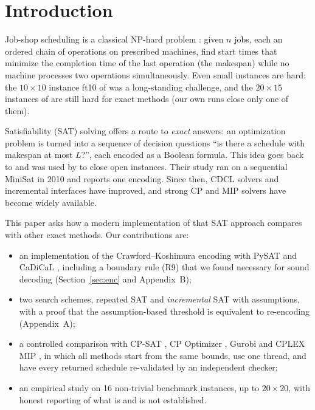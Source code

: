 \documentclass[a4paper,fleqn]{cas-sc}
\begin{document}
\section{Introduction}
Job-shop scheduling is a classical NP-hard problem \citep{garey1976}: given $n$ jobs, each an ordered chain of operations on prescribed machines, find start times that minimize the completion time of the last operation (the makespan) while no machine processes two operations simultaneously.
Even small instances are hard: the $10\times10$ instance ft10 of \citet{fisher1963} was a long-standing challenge, and the $20\times15$ instances of \citet{adams1988} are still hard for exact methods (our own runs close only one of them).

Satisfiability (SAT) solving offers a route to \emph{exact} answers: an optimization problem is turned into a sequence of decision questions ``is there a schedule with makespan at most $L$?'', each encoded as a Boolean formula.
This idea goes back to \citet{crawford1994} and was used by \citet{koshimura2010} to close open instances.
Their study ran on a sequential MiniSat in 2010 and reports one encoding.
Since then, CDCL solvers and incremental interfaces have improved, and strong CP and MIP solvers have become widely available.

This paper asks how a modern implementation of that SAT approach compares with other exact methods.
Our contributions are:
\begin{itemize}
  \item an implementation of the Crawford--Koshimura encoding with PySAT \citep{ignatiev2018} and CaDiCaL \citep{biere2020}, including a boundary rule (R9) that we found necessary for sound decoding (Section~\ref{sec:enc} and Appendix~B);
  \item two search schemes, repeated SAT and \emph{incremental} SAT with assumptions, with a proof that the assumption-based threshold is equivalent to re-encoding (Appendix~A);
  \item a controlled comparison with CP-SAT \citep{ortools}, CP Optimizer \citep{laborie2018}, Gurobi \citep{gurobi} and CPLEX MIP \citep{cplex}, in which all methods start from the same bounds, use one thread, and have every returned schedule re-validated by an independent checker;
  \item an empirical study on 16 non-trivial benchmark instances, up to $20\times20$, with honest reporting of what is and is not established.
\end{itemize}
\end{document}
